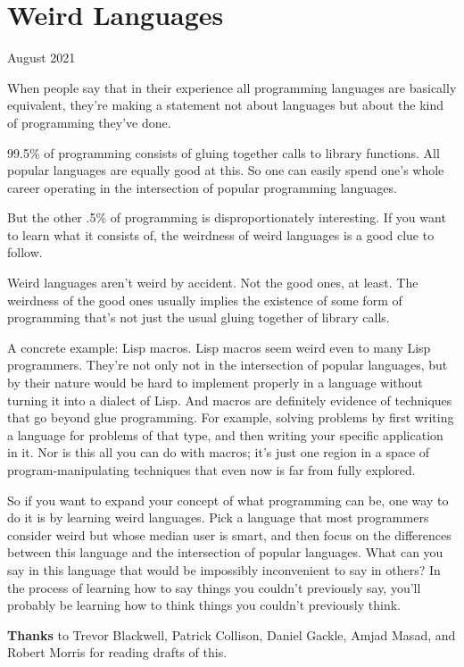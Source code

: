 \chapter{Weird Languages}

August 2021

When people say that in their experience all programming languages are
basically equivalent, they're making a statement not about languages but
about the kind of programming they've done.

99.5\% of programming consists of gluing together calls to library
functions. All popular languages are equally good at this. So one can
easily spend one's whole career operating in the intersection of popular
programming languages.

But the other .5\% of programming is disproportionately interesting. If
you want to learn what it consists of, the weirdness of weird languages
is a good clue to follow.

Weird languages aren't weird by accident. Not the good ones, at least.
The weirdness of the good ones usually implies the existence of some
form of programming that's not just the usual gluing together of library
calls.

A concrete example: Lisp macros. Lisp macros seem weird even to many
Lisp programmers. They're not only not in the intersection of popular
languages, but by their nature would be hard to implement properly in a
language without turning it into a dialect of Lisp. And macros are
definitely evidence of techniques that go beyond glue programming. For
example, solving problems by first writing a language for problems of
that type, and then writing your specific application in it. Nor is this
all you can do with macros; it's just one region in a space of
program-manipulating techniques that even now is far from fully
explored.

So if you want to expand your concept of what programming can be, one
way to do it is by learning weird languages. Pick a language that most
programmers consider weird but whose median user is smart, and then
focus on the differences between this language and the intersection of
popular languages. What can you say in this language that would be
impossibly inconvenient to say in others? In the process of learning how
to say things you couldn't previously say, you'll probably be learning
how to think things you couldn't previously think.

\textbf{Thanks} to Trevor Blackwell, Patrick Collison, Daniel Gackle,
Amjad Masad, and Robert Morris for reading drafts of this.
